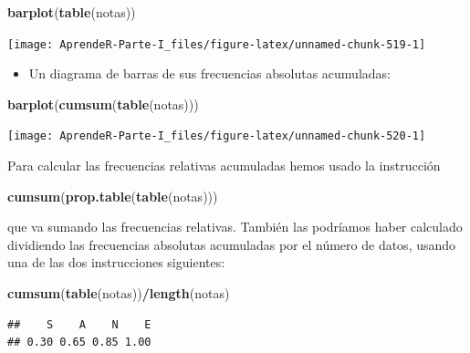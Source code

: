\documentclass[]{book}
\newenvironment{Shaded}{\begin{snugshade}}{\end{snugshade}}
\newcommand{\KeywordTok}[1]{\textcolor[rgb]{0.13,0.29,0.53}{\textbf{#1}}}
\newcommand{\NormalTok}[1]{#1}
\newcommand{\OperatorTok}[1]{\textcolor[rgb]{0.81,0.36,0.00}{\textbf{#1}}}
\providecommand{\tightlist}{%
  \setlength{\itemsep}{0pt}\setlength{\parskip}{0pt}}
\theoremstyle{definition}
\theoremstyle{definition}
\theoremstyle{definition}
\theoremstyle{remark}
\begin{document}
\begin{Shaded}
\begin{Highlighting}[]
\KeywordTok{barplot}\NormalTok{(}\KeywordTok{table}\NormalTok{(notas))}
\end{Highlighting}
\end{Shaded}

\begin{center}\texttt{[image: AprendeR-Parte-I\_files/figure-latex/unnamed-chunk-519-1]} \end{center}

\begin{itemize}
\tightlist
\item
  Un diagrama de barras de sus frecuencias absolutas acumuladas:
\end{itemize}

\begin{Shaded}
\begin{Highlighting}[]
\KeywordTok{barplot}\NormalTok{(}\KeywordTok{cumsum}\NormalTok{(}\KeywordTok{table}\NormalTok{(notas)))}
\end{Highlighting}
\end{Shaded}

\begin{center}\texttt{[image: AprendeR-Parte-I\_files/figure-latex/unnamed-chunk-520-1]} \end{center}

Para calcular las frecuencias relativas acumuladas hemos usado la instrucción

\begin{Shaded}
\begin{Highlighting}[]
\KeywordTok{cumsum}\NormalTok{(}\KeywordTok{prop.table}\NormalTok{(}\KeywordTok{table}\NormalTok{(notas)))}
\end{Highlighting}
\end{Shaded}

que va sumando las frecuencias relativas. También las podríamos haber calculado dividiendo las frecuencias
absolutas acumuladas por el número de datos, usando una de las dos instrucciones siguientes:

\begin{Shaded}
\begin{Highlighting}[]
\KeywordTok{cumsum}\NormalTok{(}\KeywordTok{table}\NormalTok{(notas))}\OperatorTok{/}\KeywordTok{length}\NormalTok{(notas)}
\end{Highlighting}
\end{Shaded}

\begin{verbatim}
##    S    A    N    E 
## 0.30 0.65 0.85 1.00
\end{verbatim}
\end{document}

